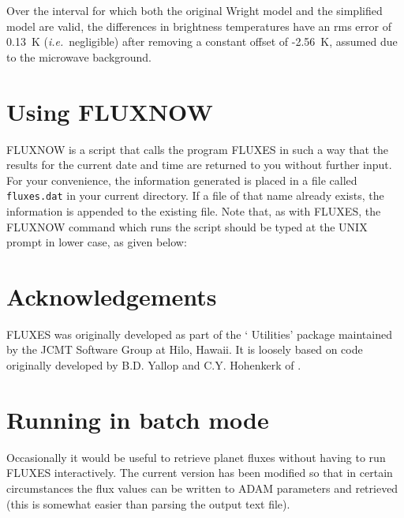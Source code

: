 \documentclass[11pt,twoside]{starlink}
\begin{document}
Over the interval for which
both the original Wright model and the simplified model are valid, the
differences in brightness temperatures have an rms error of 0.13~K
(\emph{i.e.}\ negligible) after removing a constant offset of -2.56~K, assumed
due to the microwave background.

\section{Using FLUXNOW}
\label{sec:fluxnow}


FLUXNOW is a script that calls the program FLUXES in such a way that
the results for the current date and time are returned to you without
further input.  For your convenience, the information generated is
placed in a file called \texttt{fluxes.dat} in your current directory.
If a file of that name already exists, the information is appended to
the existing file.  Note that, as with FLUXES, the FLUXNOW command
which runs the script should be typed at the UNIX prompt in lower case,
as given below:

\begin{terminalv}
\end{terminalv}

\section{Acknowledgements}
\label{sec:acknowledgements}

FLUXES was originally developed as part of the
` Utilities'
package maintained by the JCMT Software Group
at Hilo, Hawaii. It is
loosely based on code originally developed by B.D. Yallop and C.Y. Hohenkerk
of .

\clearpage

\appendix
\section{Running in batch mode}
\label{sec:batchmode}

Occasionally it would be useful to retrieve planet fluxes without having
to run FLUXES interactively. The current version has been modified so that
in certain circumstances the flux values can be written to ADAM parameters
and retrieved (this is somewhat easier than parsing the output text file).
\end{document}
